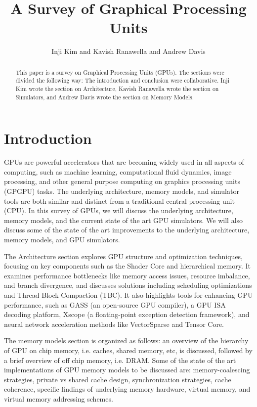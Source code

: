 \documentclass[conference]{IEEEtran}
\title{A Survey of Graphical Processing Units}
\author{\normalsize{Inji Kim and Kavish Ranawella and Andrew Davis}}
\begin{document}
\maketitle
\thispagestyle{plain}
\pagestyle{plain}




\begin{abstract}
  This paper is a survey on Graphical Processing Units (GPUs).
  The sections were divided the following way: The introduction and conclusion were collaborative.
  Inji Kim wrote the section on Architecture, Kavish Ranawella wrote the section on Simulators, and Andrew Davis wrote the section on Memory Models.
\end{abstract}

\section{Introduction}
GPUs are powerful accelerators that are becoming widely used in all aspects of computing, such as machine learning, computational fluid dynamics, image processing, and other general purpose computing on graphics processing units (GPGPU) tasks.
The underlying architecture, memory models, and simulator tools are both similar and distinct from a traditional central processing unit (CPU).
In this survey of GPUs, we will discuss the underlying architecture, memory models, and the current state of the art GPU simulators.
We will also discuss some of the state of the art improvements to the underlying architecture, memory models, and GPU simulators.

The Architecture section explores GPU structure and optimization techniques, focusing on key components such as the Shader Core and hierarchical memory. It examines performance bottlenecks like memory access issues, resource imbalance, and branch divergence, and discusses solutions including scheduling optimizations and Thread Block Compaction (TBC).
It also highlights tools for enhancing GPU performance, such as GASS (an open-source GPU compiler), a GPU ISA decoding platform, Xscope (a floating-point exception detection framework), and neural network acceleration methods like VectorSparse and Tensor Core.

The memory models section is organized as follows: an overview of the hierarchy of GPU on chip memory, i.e. caches, shared memory, etc, is discussed, followed by a brief overview of off chip memory, i.e. DRAM.
Some of the state of the art implementations of GPU memory models to be discussed are: memory-coalescing strategies, private vs shared cache design, synchronization strategies, cache coherence, specific findings of underlying memory hardware, virtual memory, and virtual memory addressing schemes.
\end{document}

